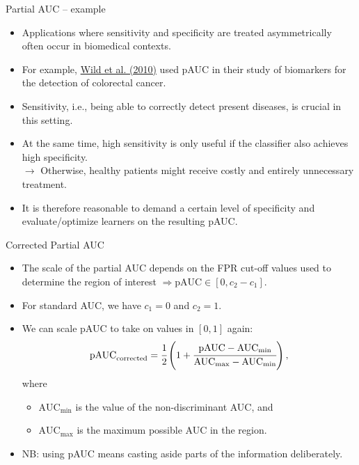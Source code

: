 
\begin{vbframe}{Partial AUC -- example}

\begin{itemize}
  \item Applications where sensitivity and specificity are treated
  asymmetrically often occur in biomedical contexts.
  \item For example,
  \href{https://clincancerres.aacrjournals.org/content/16/24/6111}
  {Wild et al. (2010)} used pAUC in their study of biomarkers for the detection
  of colorectal cancer.
  \item Sensitivity, i.e., being able to correctly detect present diseases, is
  crucial in this setting.
  \item At the same time, high sensitivity is only useful if the classifier also
  achieves high specificity. \\
  $\rightarrow$ Otherwise, healthy patients might receive costly and entirely
  unnecessary treatment.
  \item It is therefore reasonable to demand a certain level of specificity and
  evaluate/optimize learners on the resulting pAUC.
\end{itemize}

\end{vbframe}


\begin{vbframe}{Corrected Partial AUC}

\begin{itemize}
  \item The scale of the partial AUC depends on the FPR cut-off values used to
  determine the region of interest $\Rightarrow \text{pAUC} \in [0, c_2 - c_1]$.
  \item For standard AUC, we have $c_1 = 0$ and $c_2 = 1$.
  \item We can scale pAUC to take on values in $[0, 1]$ again:
  $$\text{pAUC}_\text{corrected} = \cfrac{1}{2} \left( 1 + \cfrac{\text{pAUC} -
  \text{AUC}_{\text{min}}}{\text{AUC}_{\text{max}} - \text{AUC}_{\text{min}}}
  \right),$$
  where
  \begin{itemize}
    \item $\text{AUC}_{\text{min}}$ is the value of the non-discriminant AUC,
    and
    \item $\text{AUC}_{\text{max}}$ is the maximum possible AUC in the region.
  \end{itemize}
  \lz
  \item NB: using pAUC means casting aside parts of the information
  deliberately.
\end{itemize}

\end{vbframe}

